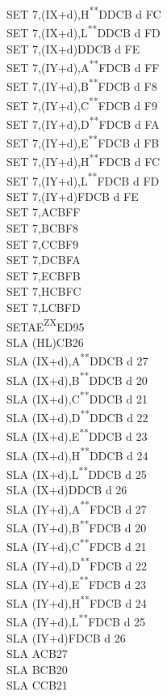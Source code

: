 \documentclass[twoside,openright,a4paper]{book}
\newcommand{\UNDOC}{\textnormal{\textsuperscript{**}}}
\newcommand{\ZXN}{\textnormal{\textsuperscript{ZX}}}
\begin{document}
\begin{multicols}{3}
{\begin{tabbing}
	SET 7,(IX+d),H\UNDOC\>DDCB d FC\\
	SET 7,(IX+d),L\UNDOC\>DDCB d FD\\
	SET 7,(IX+d)\>DDCB d FE\\
	SET 7,(IY+d),A\UNDOC\>FDCB d FF\\
	SET 7,(IY+d),B\UNDOC\>FDCB d F8\\
	SET 7,(IY+d),C\UNDOC\>FDCB d F9\\
	SET 7,(IY+d),D\UNDOC\>FDCB d FA\\
	SET 7,(IY+d),E\UNDOC\>FDCB d FB\\
	SET 7,(IY+d),H\UNDOC\>FDCB d FC\\
	SET 7,(IY+d),L\UNDOC\>FDCB d FD\\
	SET 7,(IY+d)\>FDCB d FE\\
	SET 7,A\>CBFF\\
	SET 7,B\>CBF8\\
	SET 7,C\>CBF9\\
	SET 7,D\>CBFA\\
	SET 7,E\>CBFB\\
	SET 7,H\>CBFC\\
	SET 7,L\>CBFD\\
	SETAE\ZXN\>ED95\\
	SLA (HL)\>CB26\\
	SLA (IX+d),A\UNDOC\>DDCB d 27\\
	SLA (IX+d),B\UNDOC\>DDCB d 20\\
	SLA (IX+d),C\UNDOC\>DDCB d 21\\
	SLA (IX+d),D\UNDOC\>DDCB d 22\\
	SLA (IX+d),E\UNDOC\>DDCB d 23\\
	SLA (IX+d),H\UNDOC\>DDCB d 24\\
	SLA (IX+d),L\UNDOC\>DDCB d 25\\
	SLA (IX+d)\>DDCB d 26\\
	SLA (IY+d),A\UNDOC\>FDCB d 27\\
	SLA (IY+d),B\UNDOC\>FDCB d 20\\
	SLA (IY+d),C\UNDOC\>FDCB d 21\\
	SLA (IY+d),D\UNDOC\>FDCB d 22\\
	SLA (IY+d),E\UNDOC\>FDCB d 23\\
	SLA (IY+d),H\UNDOC\>FDCB d 24\\
	SLA (IY+d),L\UNDOC\>FDCB d 25\\
	SLA (IY+d)\>FDCB d 26\\
	SLA A\>CB27\\
	SLA B\>CB20\\
	SLA C\>CB21\\

\end{tabbing}}
\end{multicols}
\end{document}
